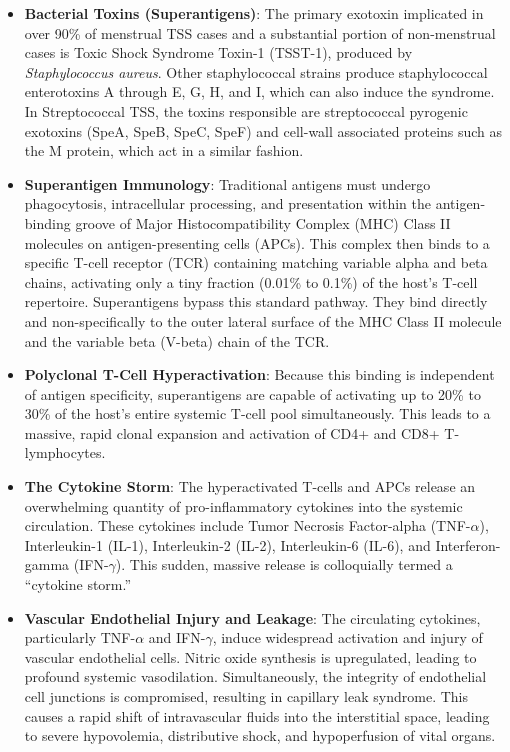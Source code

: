 \begin{itemize}
    \item \textbf{Bacterial Toxins (Superantigens)}: The primary exotoxin implicated in over 90\% of menstrual TSS cases and a substantial portion of non-menstrual cases is Toxic Shock Syndrome Toxin-1 (TSST-1), produced by \textit{Staphylococcus aureus}. Other staphylococcal strains produce staphylococcal enterotoxins A through E, G, H, and I, which can also induce the syndrome. In Streptococcal TSS, the toxins responsible are streptococcal pyrogenic exotoxins (SpeA, SpeB, SpeC, SpeF) and cell-wall associated proteins such as the M protein, which act in a similar fashion.
    \item \textbf{Superantigen Immunology}: Traditional antigens must undergo phagocytosis, intracellular processing, and presentation within the antigen-binding groove of Major Histocompatibility Complex (MHC) Class II molecules on antigen-presenting cells (APCs). This complex then binds to a specific T-cell receptor (TCR) containing matching variable alpha and beta chains, activating only a tiny fraction (0.01\% to 0.1\%) of the host's T-cell repertoire. Superantigens bypass this standard pathway. They bind directly and non-specifically to the outer lateral surface of the MHC Class II molecule and the variable beta (V-beta) chain of the TCR.
    \item \textbf{Polyclonal T-Cell Hyperactivation}: Because this binding is independent of antigen specificity, superantigens are capable of activating up to 20\% to 30\% of the host's entire systemic T-cell pool simultaneously. This leads to a massive, rapid clonal expansion and activation of CD4+ and CD8+ T-lymphocytes.
    \item \textbf{The Cytokine Storm}: The hyperactivated T-cells and APCs release an overwhelming quantity of pro-inflammatory cytokines into the systemic circulation. These cytokines include Tumor Necrosis Factor-alpha (TNF-$\alpha$), Interleukin-1 (IL-1), Interleukin-2 (IL-2), Interleukin-6 (IL-6), and Interferon-gamma (IFN-$\gamma$). This sudden, massive release is colloquially termed a ``cytokine storm.''
    \item \textbf{Vascular Endothelial Injury and Leakage}: The circulating cytokines, particularly TNF-$\alpha$ and IFN-$\gamma$, induce widespread activation and injury of vascular endothelial cells. Nitric oxide synthesis is upregulated, leading to profound systemic vasodilation. Simultaneously, the integrity of endothelial cell junctions is compromised, resulting in capillary leak syndrome. This causes a rapid shift of intravascular fluids into the interstitial space, leading to severe hypovolemia, distributive shock, and hypoperfusion of vital organs.

\end{itemize}
